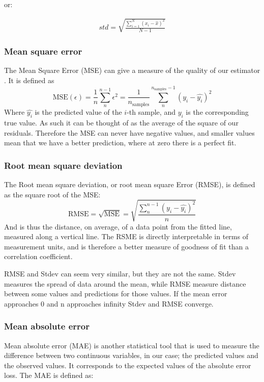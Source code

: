  or:

\begin{align}
std = \sqrt{\frac{\sum^N_{i=1} (x_i- \hat{x})^2}{N-1}}
\end{align}

\subsubsection{Mean square error}

The Mean Square Error (\ac{MSE}) can give a measure of the quality of our estimator \cite{robert2014machine}. It is defined as
\begin{equation}\label{eq: mse}
	\text{MSE}(\epsilon) = \frac{1}{n}\sum_n^{n-1}\epsilon^2 = \frac{1}{n_\text{samples}} \sum_n^{n_{\text{samples}}-1}(y_i - \hat{y_i})^2
	\end{equation}
	Where $\hat{y_i}$ is the predicted value of the $i$-th sample, and $y_i$ is the corresponding true value.
As such it can be thought of  as the average of the square of our residuals. Therefore the MSE can never have negative values, and smaller values mean that we have a better prediction, where at zero there is a perfect fit.

\subsubsection{Root mean square deviation}
The Root mean square deviation, or root mean square Error (\ac{RMSE}), is defined as the square root of the MSE:
$$\text{RMSE} = \sqrt{\text{MSE}} =  \sqrt{\frac{\sum^{n-1}_{n}(y_{i}-\hat{y_{i}})^2 }{n}} $$
And is thus the distance, on average, of a data point from the fitted line, measured along a vertical line. The RSME is directly interpretable in terms of measurement units, and is therefore a better measure of goodness of fit than a correlation coefficient.

RMSE and Stdev can seem very similar, but they are not the same. Stdev measures the spread of data around the mean, while RMSE measure distance between some values and predictions for those values. If the mean error approaches $0$ and n approaches infinity Stdev and RMSE converge.

\subsubsection{Mean absolute error}
Mean absolute error (\ac{MAE}) is another statistical tool that is used to measure the difference between two continuous variables, in our case; the predicted values and the observed values. It corresponds to the expected values of the absolute error loss. The MAE is defined as:

